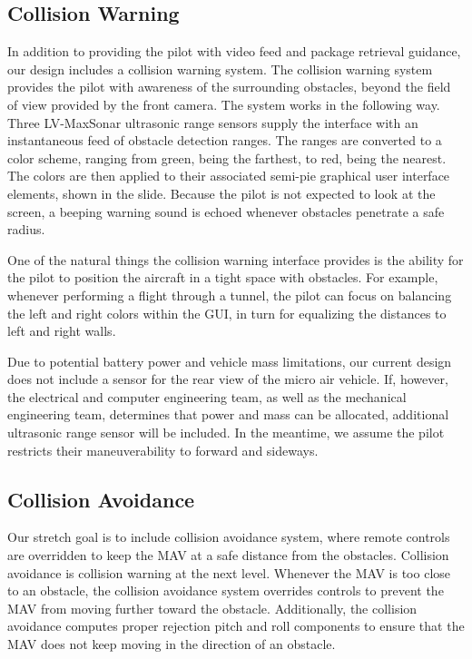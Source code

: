 \documentclass[onecolumn, oneside, letterpaper, draftclsnofoot, 10pt, compsoc]{IEEEtran}
\begin{document}
\subsection{Collision Warning}
In addition to providing the pilot with video feed and package retrieval guidance, our design includes a collision warning system. The collision warning system provides the pilot with awareness of the surrounding obstacles, beyond the field of view provided by the front camera. The system works in the following way. Three LV-MaxSonar ultrasonic range sensors supply the interface with an instantaneous feed of obstacle detection ranges. The ranges are converted to a color scheme, ranging from green, being the farthest, to red, being the nearest. The colors are then applied to their associated semi-pie graphical user interface elements, shown in the slide. Because the pilot is not expected to look at the screen, a beeping warning sound is echoed whenever obstacles penetrate a safe radius.

\noindent
One of the natural things the collision warning interface provides is the ability for the pilot to position the aircraft in a tight space with obstacles. For example, whenever performing a flight through a tunnel, the pilot can focus on balancing the left and right colors within the GUI, in turn for equalizing the distances to left and right walls.

\noindent
Due to potential battery power and vehicle mass limitations, our current design does not include a sensor for the rear view of the micro air vehicle. If, however, the electrical and computer engineering team, as well as the mechanical engineering team, determines that power and mass can be allocated, additional ultrasonic range sensor will be included. In the meantime, we assume the pilot restricts their maneuverability to forward and sideways.

\subsection{Collision Avoidance}
Our stretch goal is to include collision avoidance system, where remote controls are overridden to keep the MAV at a safe distance from the obstacles. Collision avoidance is collision warning at the next level. Whenever the MAV is too close to an obstacle, the collision avoidance system overrides controls to prevent the MAV from moving further toward the obstacle. Additionally, the collision avoidance computes proper rejection pitch and roll components to ensure that the MAV does not keep moving in the direction of an obstacle.
\end{document}
